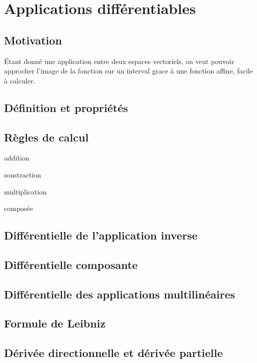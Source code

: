 \chapter{Applications différentiables}

\section{Motivation}
	Étant donné une application entre deux espaces vectoriels, on veut pouvoir
	approcher l'image de la fonction sur un interval grace à une fonction
	affine, facile à calculer.

\section{Définition et propriétés}

\section{Règles de calcul}

addition

soustraction

multiplication

composée

\section{Différentielle de l'application inverse}

\section{Différentielle composante}

\section{Différentielle des applications multilinéaires}

\section{Formule de Leibniz}

\section{Dérivée directionnelle et dérivée partielle}
